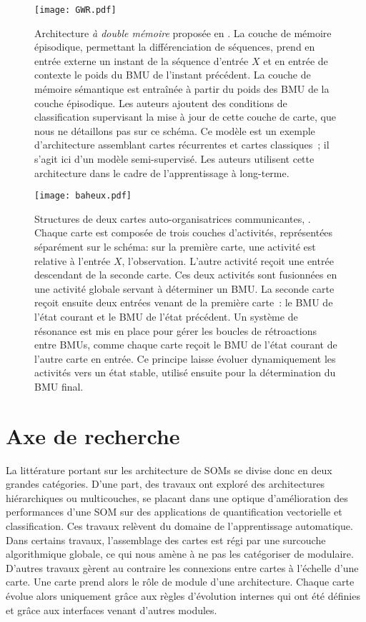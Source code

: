 \documentclass[../main]{subfiles}
\begin{document}
\begin{figure}
    \centering
    \texttt{[image: GWR.pdf]}
    \caption{Architecture \emph{à double mémoire} proposée en \cite{parisiLL}. 
    La couche de mémoire épisodique, permettant la différenciation de séquences, prend en entrée externe un instant de la séquence d'entrée $X$ et en entrée de contexte le poids du BMU de l'instant précédent.
    La couche de mémoire sémantique est entraînée à partir du poids des BMU de la couche épisodique. Les auteurs ajoutent des conditions de classification supervisant la mise à jour de cette couche de carte, que nous ne détaillons pas sur ce schéma. Ce modèle est un exemple d'architecture assemblant cartes récurrentes et cartes classiques~; il s'agit ici d'un modèle semi-supervisé. Les auteurs utilisent cette architecture dans le cadre de l'apprentissage à long-terme.\label{fig:parisi}}
\end{figure}

\begin{figure}
    \centering
    \texttt{[image: baheux.pdf]}
    \caption{Structures de deux cartes auto-organisatrices communicantes, \cite{baheux_towards_2014}. Chaque carte est composée de trois couches d'activités, représentées séparément sur le schéma: sur la première carte, une activité est relative à l'entrée $X$, l'observation. L'autre activité reçoit une entrée descendant de la seconde carte. Ces deux activités sont fusionnées en une activité globale servant à déterminer un BMU. La seconde carte reçoit ensuite deux entrées venant de la première carte~: le BMU de l'état courant et le BMU de l'état précédent. Un système de résonance est mis en place pour gérer les boucles de rétroactions entre BMUs, comme chaque carte reçoit le BMU de l'état courant de l'autre carte en entrée. Ce principe laisse évoluer dynamiquement les activités vers un état stable, utilisé ensuite pour la détermination du BMU final.\label{fig:baheux}}
\end{figure}


\section{Axe de recherche}

La littérature portant sur les architecture de SOMs se divise donc en deux grandes catégories. D'une part, des travaux ont exploré des architectures hiérarchiques ou multicouches, se placant dans une optique d'amélioration des performances d'une SOM sur des applications de quantification vectorielle et classification. Ces travaux relèvent du domaine de l'apprentissage automatique. 
Dans certains travaux, l'assemblage des cartes est régi par une surcouche algorithmique globale, ce qui nous amène à ne pas les catégoriser de modulaire. 
D'autres travaux gèrent au contraire les connexions entre cartes à l'échelle d'une carte. Une carte prend alors le rôle de module d'une architecture. Chaque carte évolue alors uniquement grâce aux règles d'évolution internes qui ont été définies et grâce aux interfaces venant d'autres modules.
\end{document}

